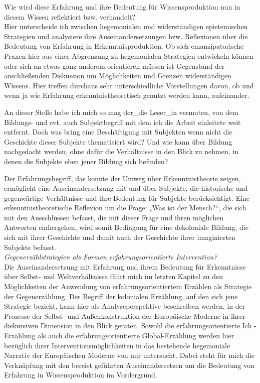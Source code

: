 Wie wird diese Erfahrung und ihre Bedeutung für Wissensproduktion nun in diesem
Wissen reflektiert bzw. verhandelt?\\ Hier unterscheide ich zwischen
hegemonialen und widerständigen epistemischen Strategien und analysiere ihre
Auseinandersetzungen bzw. Reflexionen über die Bedeutung von Erfahrung in
Erkenntnisproduktion. Ob sich emanzipatorische Praxen hier aus einer Abgrenzung
zu hegemonialen Strategien entwickeln können oder sich an etwas ganz anderem
orientieren müssen ist Gegenstand der anschließenden Diskussion um
Möglichkeiten und Grenzen widerständigen Wissens. Hier treffen durchaus sehr
unterschiedliche Vorstellungen davon, ob und wenn ja wie Erfahrung
erkenntnistheoretisch genutzt werden kann, aufeinander. 

An dieser Stelle habe ich mich so mag der\_die Leser\_in vermuten, von dem
Bildungs- und evt. auch Subjektbegriff mit dem ich die Arbeit einleitete weit
entfernt. Doch was bring eine Beschäftigung mit Subjekten wenn nicht die
Geschichte dieser Subjekte thematisiert wird? Und wie kann über Bildung
nachgedacht werden, ohne dafür die Verhältnisse in den Blick zu nehmen, in
denen die Subjekte eben jener Bildung sich befinden? 

Der Erfahrungsbegriff, das konnte der Umweg über Erkenntnistheorie zeigen,
ermöglicht eine Auseinandersetzung mit und über Subjekte, die historische und
gegenwärtige Verhältnisse und ihre Bedeutung für Subjekte berücksichtigt. Eine
erkenntnistheoretische Reflexion um die Frage: „Was ist der Mensch?“, die sich
mit den Ausschlüssen befasst, die mit dieser Frage und ihren möglichen
Antworten einhergehen, wird somit Bedingung für eine dekoloniale Bildung, die
sich mit ihrer Geschichte und damit auch der Geschichte ihrer imaginierten
Subjekte befasst.\\[0.75em]
\textit{Gegenerzählstrategien als Formen erfahrungsorientierte Intervention?}\\

Die Auseinandersetzung mit Erfahrung und ihrem Bedeutung für Erkenntnisse über
Selbst- und Weltverhältnisse führt mich im letzten Kapitel zu den Möglichkeiten
der Anwendung von erfahrungsorientiertem Erzählen als Strategie der
Gegenerzählung. Der Begriff der kolonialen Erzählung, auf den sich jene
Strategie bezieht, kann hier als Analyseperspektive beschreiben werden, in der
Prozesse der Selbst- und Außenkonstruktion der Europäische Moderne in ihrer
diskursiven Dimension in den Blick geraten. Sowohl die erfahrungsorientierte
Ich - Erzählung als auch die erfahrungsorientierte Global-Erzählung werden hier
bezüglich ihrer Interventionsmöglichkeiten in das bestehende hegemoniale
Narrativ der Europäischen Moderne von mir untersucht. Dabei steht für mich die
Verknüpfung mit den bereist geführten Auseinandersetzen um die Bedeutung von
Erfahrung in Wissensproduktion im Vordergrund.

